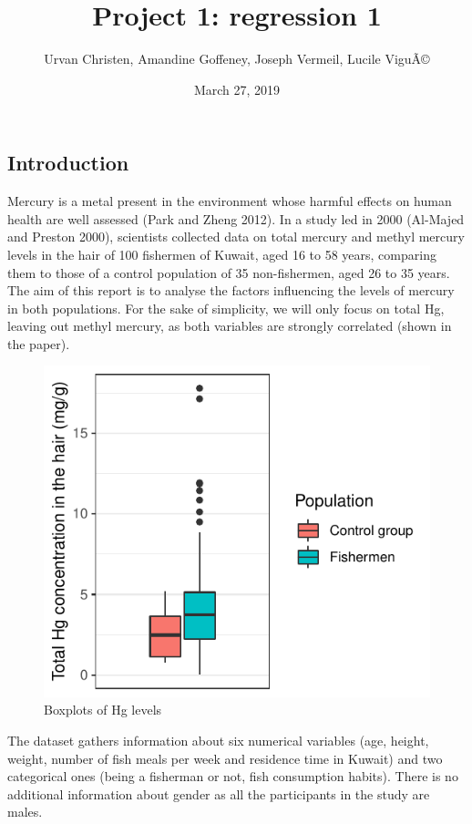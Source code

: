 \documentclass[12pt,]{article}
\title{Project 1: regression 1}
\author{Urvan Christen, Amandine Goffeney, Joseph Vermeil, Lucile ViguÃ©}
\date{March 27, 2019}
\begin{document}
\maketitle

\subsection{Introduction}\label{introduction}

Mercury is a metal present in the environment whose harmful effects on
human health are well assessed (Park and Zheng 2012). In a study led in
2000 (Al-Majed and Preston 2000), scientists collected data on total
mercury and methyl mercury levels in the hair of 100 fishermen of
Kuwait, aged 16 to 58 years, comparing them to those of a control
population of 35 non-fishermen, aged 26 to 35 years. The aim of this
report is to analyse the factors influencing the levels of mercury in
both populations. For the sake of simplicity, we will only focus on
total Hg, leaving out methyl mercury, as both variables are strongly
correlated (shown in the paper).

\begin{figure}

\hfill{}\includegraphics{Report_files/figure-latex/unnamed-chunk-4-1} 

\caption{Boxplots of Hg levels}\label{fig:unnamed-chunk-4}
\end{figure}

The dataset gathers information about six numerical variables (age,
height, weight, number of fish meals per week and residence time in
Kuwait) and two categorical ones (being a fisherman or not, fish
consumption habits). There is no additional information about gender as
all the participants in the study are males.
\end{document}
